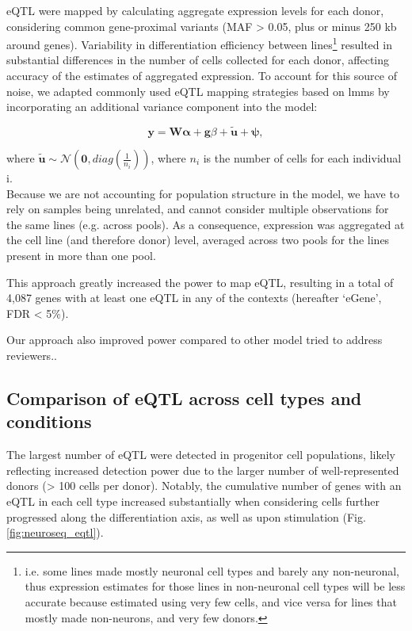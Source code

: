 eQTL were mapped by calculating aggregate expression levels for each donor, considering common gene-proximal variants (MAF > 0.05, plus or minus 250 kb around genes). 
Variability in differentiation efficiency between lines\footnote{i.e. some lines made mostly neuronal cell types and barely any non-neuronal, thus expression estimates for those lines in non-neuronal cell types will be less accurate because estimated using very few cells, and vice versa for lines that mostly made non-neurons, and very few donors.} resulted in substantial differences in the number of cells collected for each donor, affecting accuracy of the estimates of aggregated expression. 
To account for this source of noise, we adapted commonly used eQTL mapping strategies \cite{cuomo2020single} based on \glspl{lmm} by incorporating an additional variance component into the model:

\begin{equation}
    \mathbf{y} = \mathbf{W}\boldsymbol{\alpha} + \mathbf{g}\beta + \tilde{\mathbf{u}} + \boldsymbol{\psi}, 
\end{equation}

where $\tilde{\mathbf{u}} \sim \mathcal{N}(\mathbf{0}, diag(\frac{1}{n_i}))$, where $n_i$ is the number of cells for each individual i.\\

Because we are not accounting for population structure in the model, we have to rely on samples being unrelated, and cannot consider multiple observations for the same lines (e.g. across pools). 
As a consequence, expression was aggregated at the cell line (and therefore donor) level, averaged across two pools for the lines present in more than one pool.

This approach greatly increased the power to map eQTL, resulting in a total of 4,087 genes with at least one eQTL in any of the contexts (hereafter `eGene', FDR < 5\%).

Our approach also improved power compared to other model tried to address reviewers..

\subsection{Comparison of eQTL across cell types and conditions}

The largest number of eQTL were detected in progenitor cell populations, likely reflecting increased detection power due to the larger number of well-represented donors (> 100 cells per donor). 
Notably, the cumulative number of genes with an eQTL in each cell type increased substantially when considering cells further progressed along the differentiation axis, as well as upon stimulation (Fig. \ref{fig:neuroseq_eqtl}). 


